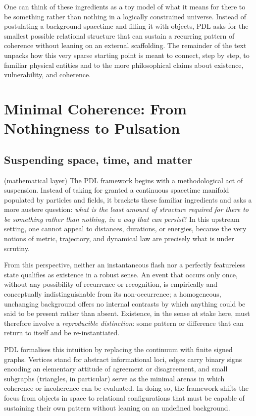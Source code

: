 \documentclass[11pt,a4paper]{article}
\theoremstyle{definition}
\begin{document}
One can think of these ingredients as a toy model of what it means for there to be something rather than nothing in a logically constrained universe. Instead of postulating a background spacetime and filling it with objects, PDL asks for the smallest possible relational structure that can sustain a recurring pattern of coherence without leaning on an external scaffolding. The remainder of the text unpacks how this very sparse starting point is meant to connect, step by step, to familiar physical entities and to the more philosophical claims about existence, vulnerability, and coherence.

\section{Minimal Coherence: From Nothingness to Pulsation}
\label{sec:minimal_coherence}

\subsection{Suspending space, time, and matter}

(mathematical layer) The PDL framework begins with a methodological act of suspension. Instead of taking for granted a continuous spacetime manifold populated by particles and fields, it brackets these familiar ingredients and asks a more austere question: \emph{what is the least amount of structure required for there to be something rather than nothing, in a way that can persist}?  \cite{Laubscher_IntroPDL_2024,Laubscher_EmergencePhysicalReality_2024,Laubscher_Existence_PulsatingClosure_2026} In this upstream setting, one cannot appeal to distances, durations, or energies, because the very notions of metric, trajectory, and dynamical law are precisely what is under scrutiny.

From this perspective, neither an instantaneous flash nor a perfectly featureless state qualifies as existence in a robust sense. An event that occurs only once, without any possibility of recurrence or recognition, is empirically and conceptually indistinguishable from its non-occurrence; a homogeneous, unchanging background offers no internal contrasts by which anything could be said to be present rather than absent.\cite{Laubscher_Existence_PulsatingClosure_2026} Existence, in the sense at stake here, must therefore involve a \emph{reproducible distinction}: some pattern or difference that can return to itself and be re-instantiated.

PDL formalises this intuition by replacing the continuum with finite signed graphs. Vertices stand for abstract informational loci, edges carry binary signs encoding an elementary attitude of agreement or disagreement, and small subgraphs (triangles, in particular) serve as the minimal arenas in which coherence or incoherence can be evaluated.\cite{Laubscher_EmergencePhysicalReality_2024,Laubscher_PDL_Position_2024} In doing so, the framework shifts the focus from objects in space to relational configurations that must be capable of sustaining their own pattern without leaning on an undefined background.
\end{document}
